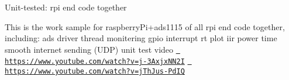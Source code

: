 Unit-\/tested\+: rpi end code together

This is the work sample for raspberry\+Pi+ads1115 of all rpi end code together, including\+: ads driver thread monitering gpio interrupt rt plot iir power time smooth internet sending (U\+DP) unit test video \href{https://www.youtube.com/watch?v=j-3AxjxNN2I}{\texttt{ https\+://www.\+youtube.\+com/watch?v=j-\/3\+Axjx\+N\+N2I}} \href{https://www.youtube.com/watch?v=jThJus-PdIQ}{\texttt{ https\+://www.\+youtube.\+com/watch?v=j\+Th\+Jus-\/\+Pd\+IQ}} 